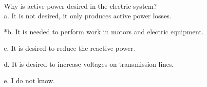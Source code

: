 
Why is active power desired in the electric system?\\

a. It is not desired, it only produces active power losses.

*b. It is needed to perform work in motors and electric equipment.

c. It is desired to reduce the reactive power.

d. It is desired to increase voltages on transmission lines.

e. I do not know.\\
